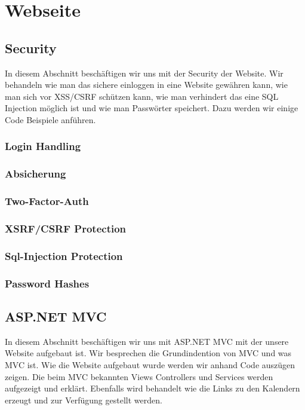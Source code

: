 \documentclass[12pt]{scrartcl}
\begin{document}
 
\section{Webseite}
\label{sec:Webseite}
\subsection{Security}
\label{sec:Security}
In diesem Abschnitt beschäftigen wir uns mit der Security der Website.
Wir behandeln wie man das sichere einloggen in eine Website gewähren kann, 
wie man sich vor XSS/CSRF schützen kann, wie man verhindert das eine SQL Injection
möglich ist und wie man Passwörter speichert. Dazu werden wir einige Code Beispiele anführen.

\subsubsection{Login Handling}
\label{sec:Login}
\subsubsection{Absicherung}
\label{sec:Absicherung}
\subsubsection{Two-Factor-Auth}
\label{sec:tfa}
\subsubsection{XSRF/CSRF Protection}
\label{sec:xss}
\subsubsection{Sql-Injection Protection}
\label{sec:sqli}
\subsubsection{Password Hashes}
\label{sec:hash}
\subsection{ASP.NET MVC}
In diesem Abschnitt beschäftigen wir uns mit ASP.NET MVC mit der unsere Website aufgebaut ist. Wir besprechen die Grundindention von MVC und was MVC ist. Wie die Website aufgebaut wurde werden wir anhand Code auszügen zeigen. Die beim MVC bekannten Views Controllers und Services werden aufgezeigt und erklärt. Ebenfalls wird behandelt wie die Links zu den Kalendern erzeugt und zur Verfügung gestellt werden. 
\label{sec:MVC}
\end{document}
